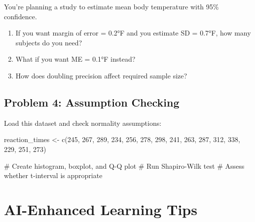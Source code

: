 \documentclass[11pt]{article}
\begin{document}
You're planning a study to estimate mean body temperature with 95\% confidence.

\begin{enumerate}[label=\alph*)]
\item If you want margin of error = 0.2°F and you estimate SD = 0.7°F, how many subjects do you need?
\item What if you want ME = 0.1°F instead?
\item How does doubling precision affect required sample size?
\end{enumerate}

\vspace{3cm}

\subsection{Problem 4: Assumption Checking}

Load this dataset and check normality assumptions:

\begin{rcode}
reaction_times <- c(245, 267, 289, 234, 256, 278, 298, 241,
                    263, 287, 312, 338, 229, 251, 273)

# Create histogram, boxplot, and Q-Q plot
# Run Shapiro-Wilk test
# Assess whether t-interval is appropriate
\end{rcode}

\vspace{3cm}

\section{\textcolor{aiblue}{AI-Enhanced Learning Tips}}
\end{document}
